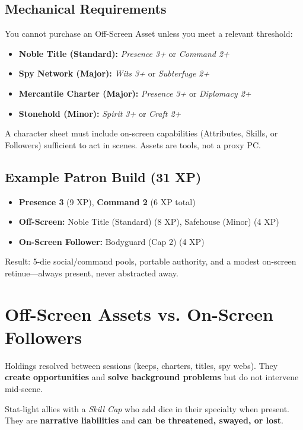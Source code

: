 \documentclass[12pt]{book}
\begin{document}
\subsection{Mechanical Requirements}
\begin{description}[leftmargin=2cm]
  \item[Face Requirement] You cannot purchase an Off-Screen Asset unless you meet a relevant threshold:
    \begin{itemize}
      \item \textbf{Noble Title (Standard):} \textit{Presence 3+} or \textit{Command 2+}
      \item \textbf{Spy Network (Major):} \textit{Wits 3+} or \textit{Subterfuge 2+}
      \item \textbf{Mercantile Charter (Major):} \textit{Presence 3+} or \textit{Diplomacy 2+}
      \item \textbf{Stonehold (Minor):} \textit{Spirit 3+} or \textit{Craft 2+}
    \end{itemize}
  \item[No Empty Chair] A character sheet must include on-screen capabilities (Attributes, Skills, or Followers) sufficient to act in scenes. Assets are tools, not a proxy PC.
\end{description}

\subsection{Example Patron Build (31 XP)}
\begin{itemize}
  \item \textbf{Presence 3} (9 XP), \textbf{Command 2} (6 XP total)
  \item \textbf{Off-Screen:} Noble Title (Standard) (8 XP), Safehouse (Minor) (4 XP)
  \item \textbf{On-Screen Follower:} Bodyguard (Cap 2) (4 XP)
\end{itemize}
\noindent
Result: 5-die social/command pools, portable authority, and a modest on-screen retinue—always present, never abstracted away.

\section{Off-Screen Assets vs. On-Screen Followers}
\begin{description}[leftmargin=2cm]
  \item[Off-Screen Assets] Holdings resolved between sessions (keeps, charters, titles, spy webs). They \textbf{create opportunities} and \textbf{solve background problems} but do not intervene mid-scene.
  \item[On-Screen Followers] Stat-light allies with a \textit{Skill Cap} who add dice in their specialty when present. They are \textbf{narrative liabilities} and \textbf{can be threatened, swayed, or lost}.
\end{description}
\end{document}
